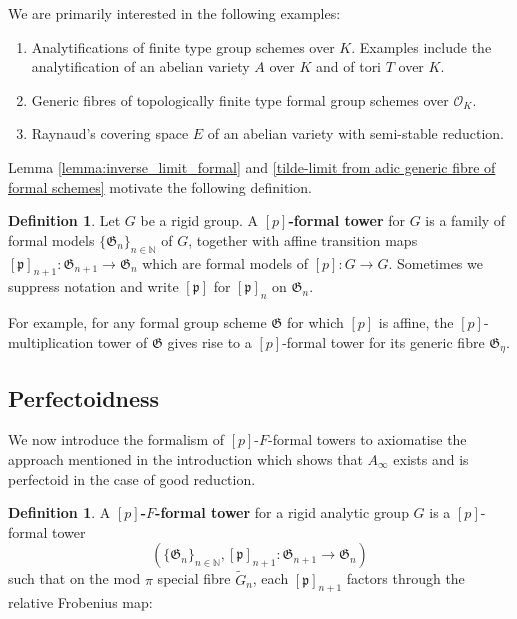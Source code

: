 \documentclass[10pt,oneside]{amsart}
\theoremstyle{definition}
\newtheorem{definition}[theorem]{Definition}
\begin{document}
We are primarily interested in the following examples:
\begin{enumerate}	 
\item Analytifications of finite type group schemes over $K$. Examples include the analytification of an abelian variety $A$ over $K$ and of tori $T$ over $K$.
\item Generic fibres of topologically finite type formal group schemes over $\mathcal O_K$.
\item Raynaud's covering space $E$  of an abelian variety with semi-stable reduction.
\end{enumerate}

	Lemma \ref{lemma:inverse_limit_formal} and  \ref{tilde-limit from adic generic fibre of formal schemes} motivate the following definition. 
	\begin{definition}
	Let $G$ be a rigid group. A \textbf{$[p]$-formal tower} for $G$ is  a family of formal models $\{\mathfrak G_n\}_{n\in \mathbb N}$ of $G$, together with affine transition maps $[\mathfrak p]_{n+1}:\mathfrak G_{n+1}\rightarrow \mathfrak G_{n}$ which are formal models of $[p]:G\rightarrow G$. Sometimes we suppress notation and write $[\mathfrak p]$ for $[\mathfrak p]_{n}$ on $\mathfrak G_n$. 
	\end{definition}
	For example, for any formal group scheme $\mathfrak G$ for which $[p]$ is affine, the $[p]$-multiplication tower of $\mathfrak G$ gives rise to a $[p]$-formal tower for its generic fibre $\mathfrak G_\eta$. 
	
	
	
	
	\subsection{Perfectoidness}  \label{subsection:perfectoid_tilde_limit}

We now introduce the formalism of $[p]$-$F$-formal towers to axiomatise the approach mentioned in the introduction which shows that $A_\infty$ exists and is perfectoid in the case of good reduction.
	
	\begin{definition}
		A \textbf{$[p]$-$F$-formal tower} for a rigid analytic group $G$ is a $[p]$-formal tower 
		$$(\{\mathfrak G_n\}_{n\in \mathbb N}, [\mathfrak p]_{n+1}:\mathfrak G_{n+1}\rightarrow \mathfrak G_{n})$$ such that on the mod $\pi$ special fibre  $\tilde{G}_n$, each   $[\mathfrak p]_{n+1}$ factors through the relative Frobenius map:
				\begin{center}
				\end{center}
	 
	\end{definition}	
	
\end{document}
